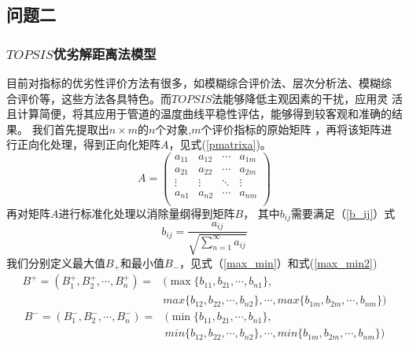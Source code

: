     \subsection{问题二}
        \subsubsection{$TOPSIS$优劣解距离法模型}
        目前对指标的优劣性评价方法有很多，如模糊综合评价法、层次分析法、模糊综
        合评价等，这些方法各具特色。而$TOPSIS$法能够降低主观因素的干扰，应用灵
        活且计算简便，将其应用于管道的温度曲线平稳性评估，能够得到较客观和准确的结果。
        我们首先提取出$n×m$的$n$个对象,$m$个评价指标的原始矩阵
        ，再将该矩阵进行正向化处理，得到正向化矩阵$A$，见式(\ref{pmatrixa})。
        \begin{equation}
            A=\begin{pmatrix}
                a_{11} & a_{12} & \cdots& a_{1m}\\
                a_{21} & a_{22} & \cdots& a_{2m}\\
                \vdots & \vdots & \ddots& \vdots\\
                a_{n1} & a_{n2} & \cdots& a_{nm}\\
                \end{pmatrix}
                \label{pmatrixa}
        \end{equation}
        再对矩阵$A$进行标准化处理以消除量纲得到矩阵$B$，
        其中$b_{ij}$需要满足（\ref{b_ij}）式
        \begin{equation}
            b_{ij}=\frac{a_{ij}}{\sqrt{\sum_{n = 1}^{\infty} a_{ij} }}
            \label{b_ij}
        \end{equation}
        我们分别定义最大值$B_+$和最小值$B_-$，见式（\ref{max_min}）和式(\ref{max_min2})
        \begin{equation}
            \begin{aligned}
                B^+ = (B_1^+, B_2^+,\cdots, B_n^+)=&(\max \{b_{11},b_{21},\cdots,b_{n1}\},\\
                &max\{b_{12},b_{22},\cdots,b_{n2}\},\cdots,max\{b_{1m},b_{2m},\cdots,b_{nm}\})   
            \end{aligned}
            \label{max_min1}
        \end{equation}
        \begin{equation}
            \begin{aligned}
                B^- = (B_1^-, B_2^-,\cdots, B_n^-)=&(\min \{b_{11},b_{21},\cdots,b_{n1}\},\\
                &min\{b_{12},b_{22},\cdots,b_{n2}\},\cdots,min\{b_{1m},b_{2m},\cdots,b_{nm}\})
            \end{aligned}
            \label{max_min2}
        \end{equation}
